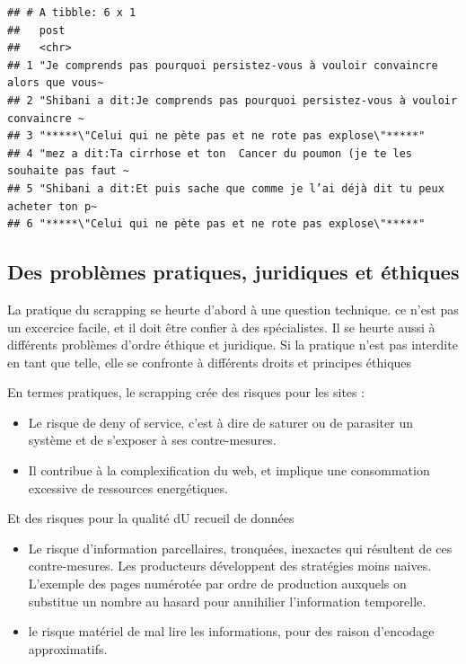 \documentclass[
]{book}
\providecommand{\tightlist}{%
  \setlength{\itemsep}{0pt}\setlength{\parskip}{0pt}}
\begin{document}
\begin{verbatim}
## # A tibble: 6 x 1
##   post                                                                          
##   <chr>                                                                         
## 1 "Je comprends pas pourquoi persistez-vous à vouloir convaincre alors que vous~
## 2 "Shibani a dit:Je comprends pas pourquoi persistez-vous à vouloir convaincre ~
## 3 "*****\"Celui qui ne pète pas et ne rote pas explose\"*****"                  
## 4 "mez a dit:Ta cirrhose et ton  Cancer du poumon (je te les souhaite pas faut ~
## 5 "Shibani a dit:Et puis sache que comme je l’ai déjà dit tu peux acheter ton p~
## 6 "*****\"Celui qui ne pète pas et ne rote pas explose\"*****"
\end{verbatim}

\hypertarget{des-probluxe8mes-pratiques-juridiques-et-uxe9thiques}{%
\subsection{Des problèmes pratiques, juridiques et éthiques}\label{des-probluxe8mes-pratiques-juridiques-et-uxe9thiques}}

La pratique du scrapping se heurte d'abord à une question technique. ce n'est pas un excercice facile, et il doit être confier à des spécialistes. Il se heurte aussi à différents problèmes d'ordre éthique et juridique. Si la pratique n'est pas interdite en tant que telle, elle se confronte à différents droits et principes éthiques

En termes pratiques, le scrapping crée des risques pour les sites :

\begin{itemize}
\tightlist
\item
  Le risque de deny of service, c'est à dire de saturer ou de parasiter un système et de s'exposer à ses contre-mesures.
\item
  Il contribue à la complexification du web, et implique une consommation excessive de ressources energétiques.
\end{itemize}

Et des risques pour la qualité dU recueil de données

\begin{itemize}
\tightlist
\item
  Le risque d'information parcellaires, tronquées, inexactes qui résultent de ces contre-mesures. Les producteurs développent des stratégies moins naives. L'exemple des pages numérotée par ordre de production auxquels on substitue un nombre au hasard pour annihilier l'information temporelle.
\item
  le risque matériel de mal lire les informations, pour des raison d'encodage approximatifs.
\end{itemize}
\end{document}

